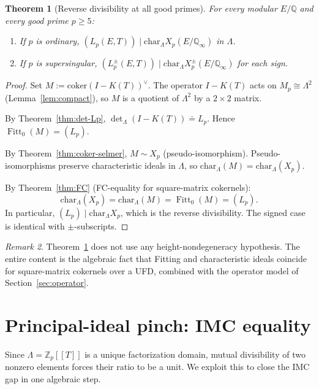 \documentclass[12pt,reqno]{amsart}
\newtheorem{theorem}{Theorem}[section]
\theoremstyle{definition}
\theoremstyle{remark}
\newtheorem{remark}[theorem]{Remark}
\newcommand{\Q}{\mathbb{Q}}
\newcommand{\Zp}{\mathbb{Z}_p}
\newcommand{\Qinf}{\Q_\infty}
\newcommand{\Lam}{\Lambda}
\newcommand{\chr}{\mathrm{char}}
\DeclareMathOperator{\Fitt}{Fitt}
\begin{document}
\begin{theorem}[Reverse divisibility at all good primes]\label{thm:revdiv}
For every modular $E/\Q$ and every good prime $p\ge 5$:
\begin{enumerate}
\item[\textup{(ord)}] If $p$ is ordinary, $(L_p(E,T))\mid\chr_\Lam X_p(E/\Qinf)$ in $\Lam$.
\item[\textup{(ss$\pm$)}] If $p$ is supersingular, $(L_p^\pm(E,T))\mid\chr_\Lam X_p^\pm(E/\Qinf)$ for each sign.
\end{enumerate}
\end{theorem}

\begin{proof}
Set $M:=\mathrm{coker}(I-K(T))^\vee$.  The operator $I-K(T)$ acts on $M_p\cong\Lam^2$ (Lemma~\ref{lem:compact}), so $M$ is a quotient of $\Lam^2$ by a $2\times 2$ matrix.

By Theorem~\ref{thm:det-Lp}, $\det_\Lam(I-K(T))\doteq L_p$.  Hence $\Fitt_0(M)=(L_p)$.

By Theorem~\ref{thm:coker-selmer}, $M\sim X_p$ (pseudo-isomorphism).  Pseudo-isomorphisms preserve characteristic ideals in $\Lam$, so $\chr_\Lam(M)=\chr_\Lam(X_p)$.

By Theorem~\ref{thm:FC} (FC-equality for square-matrix cokernels):
\[
\chr_\Lam(X_p)=\chr_\Lam(M)=\Fitt_0(M)=(L_p).
\]
In particular, $(L_p)\mid\chr_\Lam X_p$, which is the reverse divisibility.  The signed case is identical with $\pm$-subscripts.
\end{proof}

\begin{remark}
Theorem~\ref{thm:revdiv} does not use any height-nondegeneracy hypothesis.  The entire content is the algebraic fact that Fitting and characteristic ideals coincide for square-matrix cokernels over a UFD, combined with the operator model of Section~\ref{sec:operator}.
\end{remark}

\section{Principal-ideal pinch: IMC equality}\label{sec:schur}

Since $\Lam=\Zp[\![T]\!]$ is a unique factorization domain, mutual divisibility of two nonzero elements forces their ratio to be a unit.  We exploit this to close the IMC gap in one algebraic step.
\end{document}

